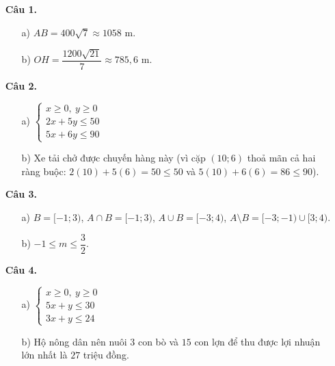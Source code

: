\documentclass[12pt,a4paper]{article}
\begin{document}
\begin{enumerate}[leftmargin=1.5em, itemsep=6pt]
    \item[\textbf{Câu 1.}] 
    \begin{itemize}[leftmargin=1.2em, itemsep=2pt]
        \item[a)] $AB = 400\sqrt{7} \approx 1058\text{ m}$.
        \item[b)] $OH = \dfrac{1200\sqrt{21}}{7} \approx 785{,}6\text{ m}$.
    \end{itemize}

    \item[\textbf{Câu 2.}] 
    \begin{itemize}[leftmargin=1.2em, itemsep=2pt]
        \item[a)] $\begin{cases} x \ge 0,\ y \ge 0 \\ 2x + 5y \le 50 \\ 5x + 6y \le 90 \end{cases}$
        \item[b)] Xe tải chở được chuyến hàng này (vì cặp $(10; 6)$ thoả mãn cả hai ràng buộc: $2(10) + 5(6) = 50 \le 50$ và $5(10) + 6(6) = 86 \le 90$).
    \end{itemize}

    \item[\textbf{Câu 3.}] 
    \begin{itemize}[leftmargin=1.2em, itemsep=2pt]
        \item[a)] $B = [-1; 3)$, \quad $A \cap B = [-1; 3)$, \quad $A \cup B = [-3; 4)$, \quad $A \setminus B = [-3; -1) \cup [3; 4)$.
        \item[b)] $-1 \le m \le \dfrac{3}{2}$.
    \end{itemize}

    \item[\textbf{Câu 4.}] 
    \begin{itemize}[leftmargin=1.2em, itemsep=2pt]
        \item[a)] $\begin{cases} x \ge 0,\ y \ge 0 \\ 5x + y \le 30 \\ 3x + y \le 24 \end{cases}$
        \item[b)] Hộ nông dân nên nuôi $3$ con bò và $15$ con lợn để thu được lợi nhuận lớn nhất là $27$ triệu đồng.
    \end{itemize}
\end{enumerate}
\end{document}
